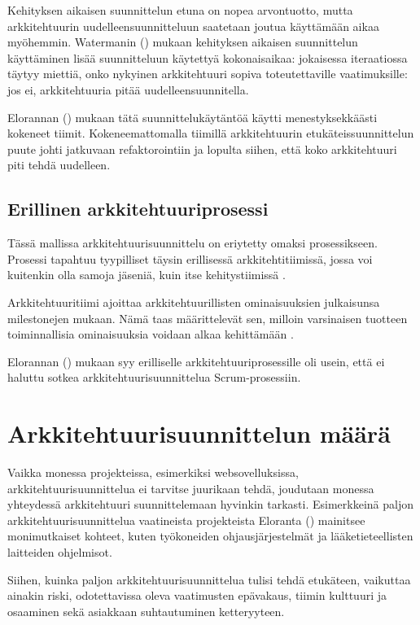 Kehityksen aikaisen suunnittelun etuna on nopea arvontuotto, mutta arkkitehtuurin uudelleensuunnitteluun saatetaan joutua käyttämään aikaa myöhemmin.
Watermanin (\citeyear{waterman_how_2015}) mukaan kehityksen aikaisen suunnittelun käyttäminen lisää suunnitteluun käytettyä kokonaisaikaa: jokaisessa iteraatiossa täytyy miettiä, onko nykyinen arkkitehtuuri sopiva toteutettaville vaatimuksille: jos ei, arkkitehtuuria pitää uudelleensuunnitella. 

Elorannan (\citeyear{eloranta2015techniques}) mukaan tätä suunnittelukäytäntöä käytti menestyksekkäästi kokeneet tiimit. Kokeneemattomalla tiimillä arkkitehtuurin etukäteissuunnittelun puute johti jatkuvaan refaktorointiin ja lopulta siihen, että koko arkkitehtuuri piti tehdä uudelleen.

\section{Erillinen arkkitehtuuriprosessi}
Tässä mallissa arkkitehtuurisuunnittelu on eriytetty omaksi prosessikseen. Prosessi tapahtuu tyypilliset täysin erillisessä arkkitehtitiimissä, jossa voi kuitenkin olla samoja jäseniä, kuin itse kehitystiimissä \citep{eloranta2015techniques}.

Arkkitehtuuritiimi ajoittaa arkkitehtuurillisten ominaisuuksien julkaisunsa milestonejen mukaan. Nämä taas määrittelevät sen, milloin varsinaisen tuotteen toiminnallisia ominaisuuksia voidaan alkaa kehittämään \citep{eloranta2015techniques}.

Elorannan (\citeyear{eloranta2015techniques}) mukaan syy erilliselle arkkitehtuuriprosessille oli usein, että ei haluttu sotkea arkkitehtuurisuunnittelua Scrum-prosessiin.

\chapter{Arkkitehtuurisuunnittelun määrä}

Vaikka monessa projekteissa, esimerkiksi websovelluksissa, arkkitehtuurisuunnittelua ei tarvitse juurikaan tehdä, joudutaan monessa yhteydessä arkkitehtuuri suunnittelemaan hyvinkin tarkasti. Esimerkkeinä paljon arkkitehtuurisuunnittelua vaatineista projekteista Eloranta (\citeyear{eloranta2015techniques}) mainitsee monimutkaiset kohteet, kuten työkoneiden ohjausjärjestelmät ja lääketieteellisten laitteiden ohjelmisot.

Siihen, kuinka paljon arkkitehtuurisuunnittelua tulisi tehdä etukäteen, vaikuttaa ainakin riski, odotettavissa oleva vaatimusten epävakaus, tiimin kulttuuri ja osaaminen sekä asiakkaan suhtautuminen ketteryyteen.

